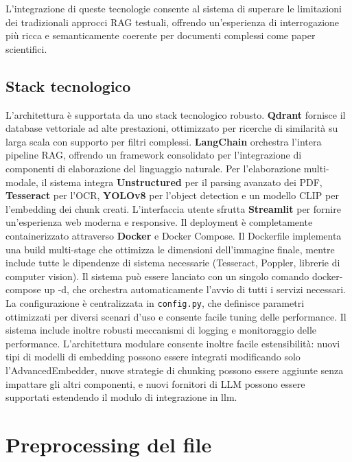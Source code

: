 L'integrazione di queste tecnologie consente al sistema di superare le limitazioni dei tradizionali approcci RAG testuali, offrendo un'esperienza di interrogazione più ricca e semanticamente coerente per documenti complessi come paper scientifici. 

\subsection{Stack tecnologico}
L'architettura è supportata da uno stack tecnologico robusto. \textbf{Qdrant} fornisce il database vettoriale ad alte prestazioni, ottimizzato per ricerche di similarità su larga scala con supporto per filtri complessi. \textbf{LangChain} orchestra l'intera pipeline RAG, offrendo un framework consolidato per l'integrazione di componenti di elaborazione del linguaggio naturale.
Per l'elaborazione multi-modale, il sistema integra \textbf{Unstructured} per il parsing avanzato dei PDF, \textbf{Tesseract} per l'OCR, \textbf{YOLOv8} per l'object detection e un modello CLIP per l'embedding dei chunk creati. L'interfaccia utente sfrutta \textbf{Streamlit} per fornire un'esperienza web moderna e responsive.
Il deployment è completamente containerizzato attraverso \textbf{Docker} e Docker Compose. Il Dockerfile implementa una build multi-stage che ottimizza le dimensioni dell'immagine finale, mentre include tutte le dipendenze di sistema necessarie (Tesseract, Poppler, librerie di computer vision). Il sistema può essere lanciato con un singolo comando docker-compose up -d, che orchestra automaticamente l'avvio di tutti i servizi necessari.
La configurazione è centralizzata in \texttt{config.py}, che definisce parametri ottimizzati per diversi scenari d'uso e consente facile tuning delle performance. Il sistema include inoltre robusti meccanismi di logging e monitoraggio delle performance.
L'architettura modulare consente inoltre facile estensibilità: nuovi tipi di modelli di embedding possono essere integrati modificando solo l'AdvancedEmbedder, nuove strategie di chunking possono essere aggiunte senza impattare gli altri componenti, e nuovi fornitori di LLM possono essere supportati estendendo il modulo di integrazione in llm.

\section{Preprocessing del file}

